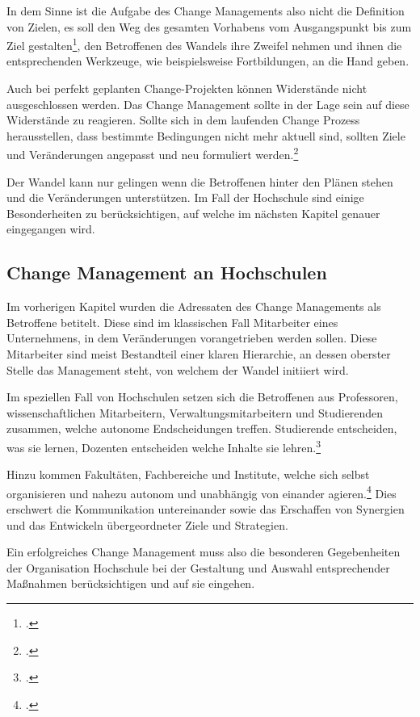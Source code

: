 In dem Sinne ist die Aufgabe des Change Managements also nicht die Definition von Zielen, es soll den Weg des gesamten Vorhabens vom Ausgangspunkt bis zum Ziel gestalten\footcite[Vgl.][]{lauer_change_2014}, den Betroffenen des Wandels ihre Zweifel nehmen und ihnen die entsprechenden Werkzeuge, wie beispielsweise Fortbildungen, an die Hand geben.

Auch bei perfekt geplanten Change-Projekten können Widerstände nicht ausgeschlossen werden. Das Change Management sollte in der Lage sein auf diese Widerstände zu reagieren. Sollte sich in dem laufenden Change Prozess herausstellen, dass bestimmte Bedingungen nicht mehr aktuell sind, sollten Ziele und Veränderungen angepasst und neu formuliert werden.\footcite[Vgl.][]{sonntag_change_2008}

Der Wandel kann nur gelingen wenn die Betroffenen hinter den Plänen stehen und die Veränderungen unterstützen. Im Fall der Hochschule sind einige Besonderheiten zu berücksichtigen, auf welche im nächsten Kapitel genauer eingegangen wird.  

\subsection{Change Management an Hochschulen}
\label{subsubsection_change_management_an_HS}
Im vorherigen Kapitel wurden die Adressaten des Change Managements als Betroffene betitelt. Diese sind im klassischen Fall Mitarbeiter eines Unternehmens, in dem Veränderungen vorangetrieben werden sollen. Diese Mitarbeiter sind meist Bestandteil einer klaren Hierarchie, an dessen oberster Stelle das Management steht, von welchem der Wandel initiiert wird. 

Im speziellen Fall von Hochschulen setzen sich die Betroffenen aus Professoren, wissenschaftlichen Mitarbeitern, Verwaltungsmitarbeitern und Studierenden zusammen, welche autonome Endscheidungen treffen. Studierende entscheiden, was sie lernen, Dozenten entscheiden welche Inhalte sie lehren.\footcite[Vgl.][]{hoelscher_wissenschaft_2011}

Hinzu kommen Fakultäten, Fachbereiche und Institute, welche sich selbst organisieren und nahezu autonom und unabhängig von einander agieren.\footcite[Vgl.][]{sonntag_change_2008}
Dies erschwert die Kommunikation untereinander sowie das Erschaffen von Synergien und das Entwickeln übergeordneter Ziele und Strategien.

Ein erfolgreiches Change Management muss also die besonderen Gegebenheiten der Organisation Hochschule bei der Gestaltung und Auswahl entsprechender Maßnahmen berücksichtigen und auf sie eingehen.

